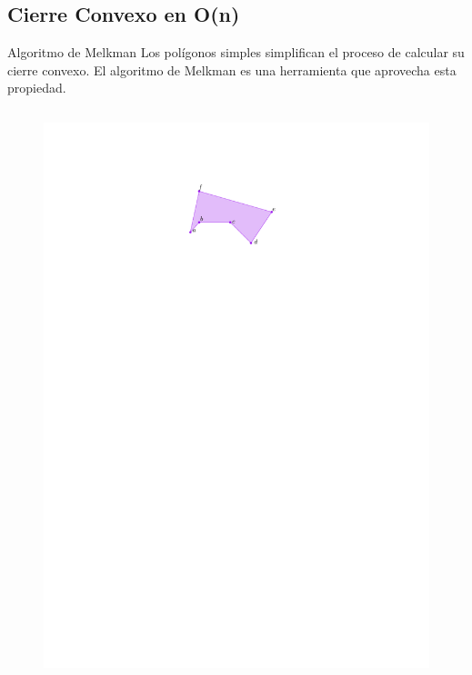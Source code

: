 \documentclass[aspectratio=169,xcolor=dvipsnames, t]{beamer}
\begin{document}
\begin{frame}{}
\begin{columns}
\begin{column}{0.45\textwidth}
\begin{figure}
      \end{figure}
    \end{column}
  \end{columns}
\end{frame}

\subsection{Cierre Convexo en O(n)}
\begin{frame}{Algoritmo de Melkman}
  Los polígonos simples simplifican el proceso de calcular su cierre convexo. El algoritmo de Melkman es una herramienta que aprovecha esta propiedad.
  \begin{columns}
    \begin{column}{0.5\textwidth}
      \begin{figure}
        \centering
        \includegraphics[width=\linewidth, height=0.5\textheight, page=1, keepaspectratio]{IPE/Melkman.pdf}

\end{figure}
\end{column}
\end{columns}
\end{frame}
\end{document}

